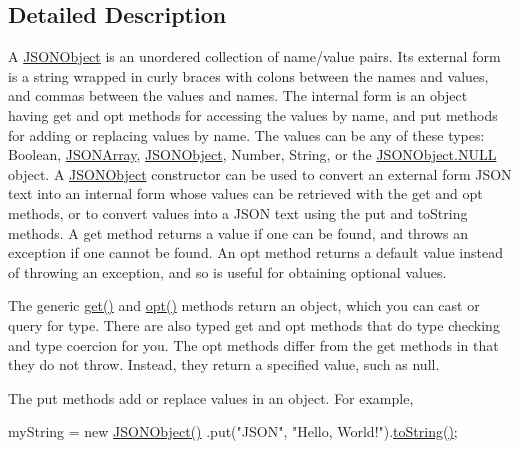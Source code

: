 \subsection{Detailed Description}
A \hyperlink{classorg_1_1json_1_1_j_s_o_n_object}{J\-S\-O\-N\-Object} is an unordered collection of name/value pairs. Its external form is a string wrapped in curly braces with colons between the names and values, and commas between the values and names. The internal form is an object having {\ttfamily get} and {\ttfamily opt} methods for accessing the values by name, and {\ttfamily put} methods for adding or replacing values by name. The values can be any of these types\-: {\ttfamily Boolean}, {\ttfamily \hyperlink{classorg_1_1json_1_1_j_s_o_n_array}{J\-S\-O\-N\-Array}}, {\ttfamily \hyperlink{classorg_1_1json_1_1_j_s_o_n_object}{J\-S\-O\-N\-Object}}, {\ttfamily Number}, {\ttfamily String}, or the {\ttfamily \hyperlink{classorg_1_1json_1_1_j_s_o_n_object_a01c74a31a1abfd34ab13beb9347855ac}{J\-S\-O\-N\-Object.\-N\-U\-L\-L}} object. A \hyperlink{classorg_1_1json_1_1_j_s_o_n_object}{J\-S\-O\-N\-Object} constructor can be used to convert an external form J\-S\-O\-N text into an internal form whose values can be retrieved with the {\ttfamily get} and {\ttfamily opt} methods, or to convert values into a J\-S\-O\-N text using the {\ttfamily put} and {\ttfamily to\-String} methods. A {\ttfamily get} method returns a value if one can be found, and throws an exception if one cannot be found. An {\ttfamily opt} method returns a default value instead of throwing an exception, and so is useful for obtaining optional values. 

The generic {\ttfamily \hyperlink{classorg_1_1json_1_1_j_s_o_n_object_ac98329762a354373a0d3fddc2855dd61}{get()}} and {\ttfamily \hyperlink{classorg_1_1json_1_1_j_s_o_n_object_a51eeabb3fde00474d3ffd7381ad5d311}{opt()}} methods return an object, which you can cast or query for type. There are also typed {\ttfamily get} and {\ttfamily opt} methods that do type checking and type coercion for you. The opt methods differ from the get methods in that they do not throw. Instead, they return a specified value, such as null. 

The {\ttfamily put} methods add or replace values in an object. For example,


\begin{DoxyPre}
myString = new \hyperlink{classorg_1_1json_1_1_j_s_o_n_object_a7c17e59daff74ce50c6677c6f5da233d}{JSONObject()}
        .put("JSON", "Hello, World!").\hyperlink{classorg_1_1json_1_1_j_s_o_n_object_a7f8cab6eb354ceb416a421574b4be424}{toString()};
\end{DoxyPre}


